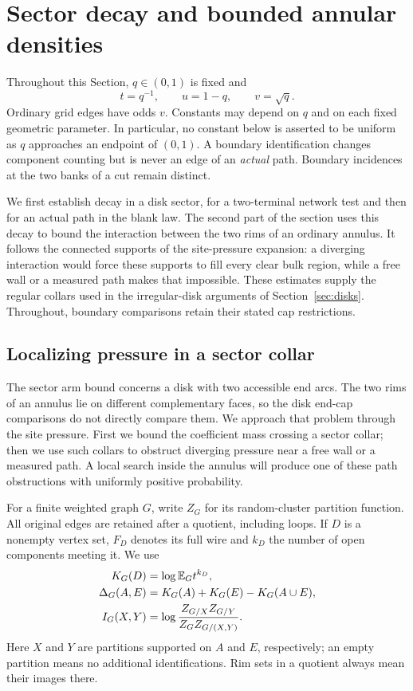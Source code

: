 \section{Sector decay and bounded annular densities}
\label{sec:sectors}

Throughout this Section, $q\in(0,1)$ is fixed and
\[
 t=q^{-1},\qquad u=1-q,\qquad v=\sqrt q.
\]
Ordinary grid edges have odds $v$.  Constants may depend on $q$ and
on each fixed geometric parameter.  In particular, no constant below
is asserted to be uniform as $q$ approaches an endpoint of $(0,1)$.
A boundary identification changes component counting but is never an
edge of an \emph{actual} path.  Boundary incidences at the two banks of
a cut remain distinct.

We first establish decay in a disk sector, for a two-terminal network
test and then for an actual path in the blank law.  The second part of
the section uses this decay to bound the interaction between the two
rims of an ordinary annulus.  It follows the connected supports of the
site-pressure expansion: a diverging interaction would force these
supports to fill every clear bulk region, while a free wall or a
measured path makes that impossible.  These estimates supply the regular
collars used in the irregular-disk arguments of Section~\ref{sec:disks}.
Throughout, boundary comparisons retain their stated cap restrictions.




\subsection{Localizing pressure in a sector collar}
\label{sector:pressure-localization}

The sector arm bound concerns a disk with two accessible end arcs.
The two rims of an annulus lie on different complementary faces, so the
disk end-cap comparisons do not directly compare them.  We approach
that problem through the site pressure.  First we bound the coefficient
mass crossing a sector collar; then we use such collars to obstruct
diverging pressure near a free wall or a measured path.  A local search
inside the annulus will produce one of these path obstructions with
uniformly positive probability.

For a finite weighted graph $G$, write $Z_G$ for its random-cluster
partition function.  All original edges are retained after a quotient,
including loops.  If $D$ is a nonempty vertex set, $F_D$ denotes its full
wire and $k_D$ the number of open components meeting it.  We use
\begin{align}
 K_G(D)&=\log\mathbb E_G t^{k_D},\label{sector:K-definition}\\
 \Delta_G(A,E)&=K_G(A)+K_G(E)-K_G(A\cup E),
 \label{sector:Delta-definition}\\
 I_G(X,Y)&=\log\frac{Z_{G/X}Z_{G/Y}}{Z_GZ_{G/(X,Y)}}.
 \label{sector:I-definition}
\end{align}
Here $X$ and $Y$ are partitions supported on $A$ and $E$, respectively;
an empty partition means no additional identifications.  Rim sets in a
quotient always mean their images there.

